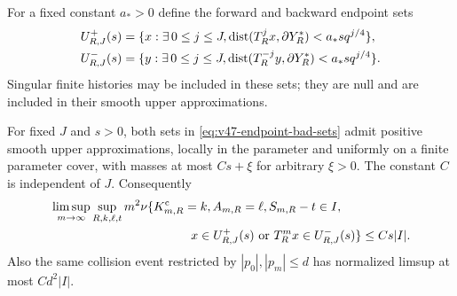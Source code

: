 For a fixed constant $a_*>0$ define the forward and backward endpoint
sets
\begin{align}
 U^+_{R,J}(s)&=\{x:\exists\,0\le j\le J,
       \operatorname{dist}(T_R^jx,\partial Y_R^*)<a_*s q^{j/4}\},\notag\\
 U^-_{R,J}(s)&=\{y:\exists\,0\le j\le J,
       \operatorname{dist}(T_R^{-j}y,\partial Y_R^*)<a_*s q^{j/4}\}.
                                      \label{eq:v47-endpoint-bad-sets}
\end{align}
Singular finite histories may be included in these sets; they are
null and are included in their smooth upper approximations.

\begin{lemma}
\label{lem:v47-endpoint-envelopes}
For fixed $J$ and $s>0$, both sets in
\eqref{eq:v47-endpoint-bad-sets} admit positive smooth upper
approximations, locally in the parameter and uniformly on a finite
parameter cover, with masses at most $C s+\xi$ for arbitrary
$\xi>0$. The constant $C$ is independent of $J$. Consequently
\begin{align}
 &\limsup_{m\to\infty}\sup_{R,k,\ell,t}m^2
 \nu\{K^{\rm c}_{m,R}=k,A_{m,R}=\ell,S_{m,R}-t\in I,\notag\\
 &\hspace{40mm}x\in U^+_{R,J}(s)
                       \text{ or }T_R^mx\in U^-_{R,J}(s)\}
                                      \le C s|I|.
                                      \label{eq:v47-bad-end-local}
\end{align}
Also the same collision event restricted by
$|p_0|,|p_m|\le d$ has normalized limsup at most $Cd^2|I|$.
\end{lemma}
